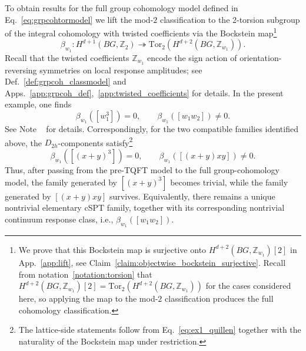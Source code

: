\documentclass[aps,prx,reprint,superscriptaddress,twocolumn,amsmath,amssymb,amsfonts, nofootinbib]{revtex4-2}
\newcommand{\tor}{\text{Tor}}
\newcommand{\Z}{\mathbb{Z}}
\theoremstyle{apsstyle}
\begin{document}
To obtain results for the full group cohomology model defined in Eq.~\ref{eq:grpcohtormodel} we lift the mod-$2$ classification to the 2-torsion subgroup of the integral cohomology with twisted coefficients via the Bockstein map\footnote{We prove that this Bockstein map is surjective onto $H^{d+2}(BG, \Z_{w_{1}})[2]$ in App.~\ref{app:lift}, see Claim~\ref{claim:objectwise_bockstein_surjective}. Recall from notation~\ref{notation:torsion} that $H^{d+2}(BG,\Z_{w_{1}})[2]=\tor_{2}\left(H^{d+2}(BG,\Z_{w_{1}})\right)$ for the cases considered here, so applying the map to the mod-$2$ classification produces the full cohomology classification.} 
\begin{equation}
\beta_{w_{1}}: H^{d+1}(BG, \mathbb{Z}_{2}) \twoheadrightarrow \tor_{2}(H^{d+2}(BG, \mathbb{Z}_{w_{1}})).
\label{eq:ex1_Bockstein}
\end{equation}
Recall that the twisted coefficients $\mathbb Z_{w_1}$ encode the sign action of orientation-reversing symmetries on local response amplitudes; see Def.~\ref{def:grpcoh_classmodel} and Apps.~\ref{app:grpcoh_def},~\ref{app:twisted_coefficients} for details.
In the present example, one finds
\begin{equation}
\beta_{w_{1}}\left(\left[w_{1}^{3}\right]\right)=0,
\qquad
\beta_{w_{1}}(\left[w_{1}w_{2}\right])\neq 0.
\label{eq:vanishing_w13}
\end{equation}
See Note ~\cite{note_kill} for details. Correspondingly, for the two compatible families identified above, the $D_{2h}$-components satisfy\footnote{The lattice-side statements follow from Eq.~\ref{eq:ex1_quillen} together with the naturality of the Bockstein map under restriction.}
\begin{equation*}
\beta_{w_{1}}\left(\left[(x+y)^{3}\right]\right)=0,
\qquad
\beta_{w_{1}}(\left[(x+y)xy\right])\neq 0.
\end{equation*}
Thus, after passing from the pre-TQFT model to the full group-cohomology model, the family generated by $[(x+y)^3]$ becomes trivial, while the family generated by $[(x+y)xy]$ survives. Equivalently, there remains a unique nontrivial elementary cSPT family, together with its corresponding nontrivial continuum response class, i.e., $\beta_{w_{1}}([w_{1}w_{2}])$.

\bigskip 
\end{document}
